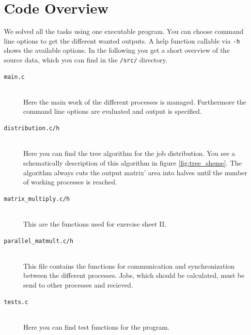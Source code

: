 \documentclass{article}
\newcommand{\enterProblemHeader}[1]{
}
\newcommand{\exitProblemHeader}[1]{
}
\newcounter{homeworkProblemCounter} %
\newcommand{\homeworkProblemName}{}
\newenvironment{homeworkProblem}[1][Problem \arabic{homeworkProblemCounter}]{ %
\stepcounter{homeworkProblemCounter} %
\renewcommand{\homeworkProblemName}{#1} %
\section{\homeworkProblemName} %
}{
}
\begin{document}
\begin{homeworkProblem}[Code Overview]
We solved all the tasks using one executable program. You can choose command line
options to get the different wanted outputs. A help function callable via
\texttt{-h} shows the available options. In the following you get a short overview
of the source data, which you can find in the \texttt{/src/} directory.
\begin{description}
    \item[\texttt{main.c}]\hfill\\
        Here the main work of the different processes is managed.
        Furthermore the command line options are evaluated and
        output is specified.
    \item[\texttt{distribution.c/h}] \hfill\\
        Here you can find the tree algorithm for the job distribution.
        You see a schematically description of this algorithm in figure
        \ref{fig:tree_sheme}. The algorithm always cuts the output
        matrix' area into halves until the number of working processes
        is reached.
    \item[\texttt{matrix\_multiply.c/h}] \hfill\\
        This are the functions used for exercise sheet II.
    \item[\texttt{parallel\_matmult.c/h}] \hfill\\
        This file contains the functions for communication and
        synchronization between the different processes.
        Jobs, which should be calculated, must be send to
        other processes and recieved.
    \item[\texttt{tests.c}] \hfill\\
        Here you can find test functions for the program.
\end{description}


\end{homeworkProblem}
\end{document}
